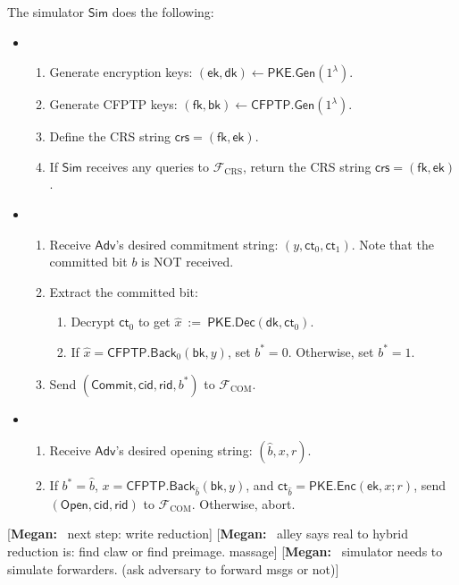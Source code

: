 \documentclass[11pt,letterpaper]{article}
\newcommand{\doclearpage}{%
  \iffull\clearpage\else\fi
}
\newcommand{\authnote}[2]{[{\color{red}\textbf{#1:}}~{\color{blue} #2}]}
\newcommand{\authnote}[2]{}
\newcommand{\megan}[1]{\authnote{Megan}{#1}}
\theoremstyle{plain} %
\theoremstyle{definition} %
\theoremstyle{remark} %
\newcommand{\eqdef}{\ {:=} \ }
\newcommand{\OpenMsg}{\mathsf{Open}}
\newcommand{\CommitMsg}{\mathsf{Commit}}
\newcommand{\Input}{x}
\newcommand{\SecParam}{\lambda}
\newcommand{\PKE}{\mathsf{PKE}}
\newcommand{\Gen}{\mathsf{Gen}}
\newcommand{\Enc}{\mathsf{Enc}}
\newcommand{\Dec}{\mathsf{Dec}}
\newcommand{\EncKey}{\mathsf{ek}}
\newcommand{\DecKey}{\mathsf{dk}}
\newcommand{\ExtBit}{b^*}
\newcommand{\AdvBit}{\Adv{b}}
\newcommand{\Ct}{\mathsf{ct}}
\newcommand{\Rand}{r}
\newcommand{\CFPTP}{\mathsf{CFPTP}}
\newcommand{\Back}{\mathsf{Back}}
\newcommand{\ForwKey}{\mathsf{fk}}
\newcommand{\BackKey}{\mathsf{bk}}
\newcommand{\Output}{y}
\newcommand{\Simulator}{{\mathsf{Sim}}} %
\newcommand{\Adversary}{{\mathsf{Adv}}} %
\newcommand{\Adv}[1]{\hat{#1}} %
\newcommand{\IF}{\mathcal{F}} %
\newcommand{\CommitterId}{\mathsf{cid}}
\newcommand{\ReceiverId}{\mathsf{rid}}
\newcommand{\IFCrs}{\IF_{\mathrm{CRS}}}
\newcommand{\crs}{\mathsf{crs}}
\newcommand{\IFCom}{\IF_{\mathrm{COM}}}
\newcommand{\CommBit}{b}
\begin{document}
The simulator $\Simulator$ does the following:
\begin{itemize}
\item \parhead{Simulate $\IFCrs$}
\begin{enumerate}[nolistsep]
    \item Generate encryption keys: $(\EncKey, \DecKey) \gets \PKE.\Gen(1^{\SecParam})$.
    \item Generate CFPTP keys: $(\ForwKey,\BackKey) \gets \CFPTP.\Gen(1^{\SecParam})$.
    \item Define the CRS string $\crs = (\ForwKey, \EncKey)$.
    \item If $\Simulator$ receives any queries to $\IFCrs$, return the CRS string $\crs = (\ForwKey, \EncKey)$.
\end{enumerate}

\item {}
\begin{enumerate}[nolistsep]
    \item Receive $\Adversary$'s desired commitment string: $(\Output, \Ct_0, \Ct_1)$. Note that the committed bit $\CommBit$ is NOT received.
    \item Extract the committed bit:
    \begin{enumerate}[nolistsep]
        \item Decrypt $\Ct_0$ to get $\Adv{\Input} \eqdef \PKE.\Dec(\DecKey, \Ct_0)$.
        \item If $\Adv{\Input} = \CFPTP.\Back_0(\BackKey, \Output)$, set $\ExtBit = 0$. Otherwise, set $\ExtBit = 1$.
    \end{enumerate}
    \item Send $(\CommitMsg, \CommitterId, \ReceiverId, \ExtBit)$ to $\IFCom$.
\end{enumerate}

\item {}
\begin{enumerate}[nolistsep]
    \item Receive $\Adversary$'s desired opening string: $(\AdvBit, \Input, \Rand)$.
	\item If $\ExtBit = \AdvBit$, $\Input = \CFPTP.\Back_{\AdvBit}(\BackKey, \Output)$, and $\Ct_{\AdvBit} = \PKE.\Enc(\EncKey, \Input; \Rand)$, send $(\OpenMsg, \CommitterId, \ReceiverId)$ to $\IFCom$. Otherwise, abort.
\end{enumerate}

\end{itemize}

\megan{next step: write reduction}
\megan{alley says real to hybrid reduction is: find claw or find preimage. massage}
\megan{simulator needs to simulate forwarders. (ask adversary to forward msgs or not)}
\doclearpage
{\small{


}}
\end{document}
